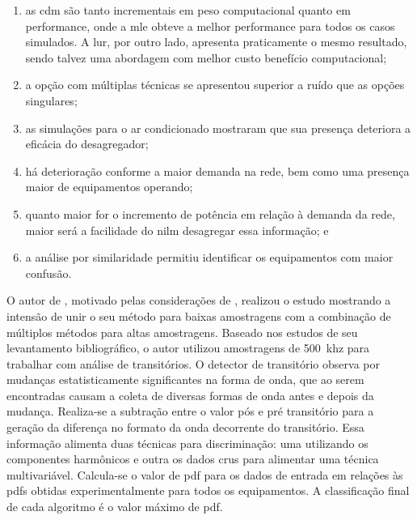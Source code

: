 \begin{enumerate}[label=\textbf{2.\arabic*},wide=\parindent]
\begin{enumerate}[label=\itshape\alph*\upshape)]
\item as \gls{cdm} são tanto incrementais em peso computacional quanto
em performance, onde a \gls{mle} obteve a melhor performance para
todos os casos simulados. A \gls{lur}, por outro lado, apresenta
praticamente o mesmo resultado, sendo talvez uma abordagem com melhor
custo benefício computacional;
\item a opção com múltiplas técnicas se apresentou superior a
ruído que as opções singulares;
\item as simulações para o ar condicionado mostraram que sua presença
deteriora a eficácia do desagregador;
\item há deterioração conforme a maior demanda na rede, bem como uma
presença maior de equipamentos operando;
\item quanto maior for o incremento de potência em relação à demanda
da rede, maior será a facilidade do \gls{nilm} desagregar essa
informação; e
\item a análise por similaridade permitiu identificar os equipamentos com
maior confusão.
\end{enumerate}

O autor de \cite{nilm_zeifman_review_2011}, motivado pelas
considerações de \cite{nilm_liang_pt2_2010_40}, realizou o estudo
\cite{nilm_zeifman_vast_hisample_pdfmerge_2011} mostrando a intensão
de unir o seu método para baixas amostragens 
\cite{nilm_zeifman_vast_2011} com a combinação de múltiplos métodos
para altas amostragens. Baseado nos estudos de seu levantamento
bibliográfico, o autor utilizou amostragens de 500~k\acs{hz} para
trabalhar com análise de transitórios. O detector de transitório
observa por mudanças estatisticamente significantes na forma de onda,
que ao serem encontradas causam a coleta de diversas formas de onda
antes e depois da mudança. Realiza-se a subtração entre o valor pós e
pré transitório para a geração da diferença no formato da onda
decorrente do transitório. Essa informação alimenta duas técnicas para
discriminação: uma utilizando os componentes harmônicos e outra os
dados crus para alimentar uma técnica multivariável. Calcula-se o
valor de \acs{pdf} para os dados de entrada em relações às
\acs{pdf}s obtidas experimentalmente para todos os equipamentos. A
classificação final de cada algoritmo é o valor máximo de
\acs{pdf}.


\end{enumerate}
